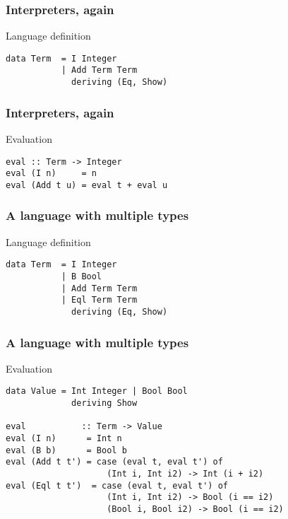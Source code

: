 \documentclass[pdftex,aspectratio=169]{beamer}
\author[Gabriel Radanne]{Dr. Gabriel Radanne}
\subtitle
{GADT: Generalized Algebraic DataType}
\begin{document}
\begin{frame}
  \titlepage
\end{frame}

\begin{frame}[fragile]
  \frametitle{Interpreters, again}
  \begin{block}{Language definition}
    \begin{lstlisting}
data Term  = I Integer
           | Add Term Term
             deriving (Eq, Show)
  \end{lstlisting}
\end{block}
\end{frame}

\begin{frame}[fragile]
  \frametitle{Interpreters, again}
  \begin{block}{Evaluation}
    \begin{lstlisting}
eval :: Term -> Integer
eval (I n)     = n
eval (Add t u) = eval t + eval u
  \end{lstlisting}
\end{block}
\end{frame}


\begin{frame}[fragile]
  \frametitle{A language with multiple types}
  \begin{block}{Language definition}
    \begin{lstlisting}
data Term  = I Integer
           | B Bool
           | Add Term Term
           | Eql Term Term
             deriving (Eq, Show)
  \end{lstlisting}
\end{block}
\end{frame}

\begin{frame}[fragile]
  \frametitle{A language with multiple types}
  \begin{block}{Evaluation}
    \begin{lstlisting}
data Value = Int Integer | Bool Bool
             deriving Show
      
eval           :: Term -> Value
eval (I n)      = Int n
eval (B b)      = Bool b
eval (Add t t') = case (eval t, eval t') of
                    (Int i, Int i2) -> Int (i + i2)
eval (Eql t t')  = case (eval t, eval t') of
                    (Int i, Int i2) -> Bool (i == i2)
                    (Bool i, Bool i2) -> Bool (i == i2)
  \end{lstlisting}
\end{block}
\end{frame}
\end{document}
